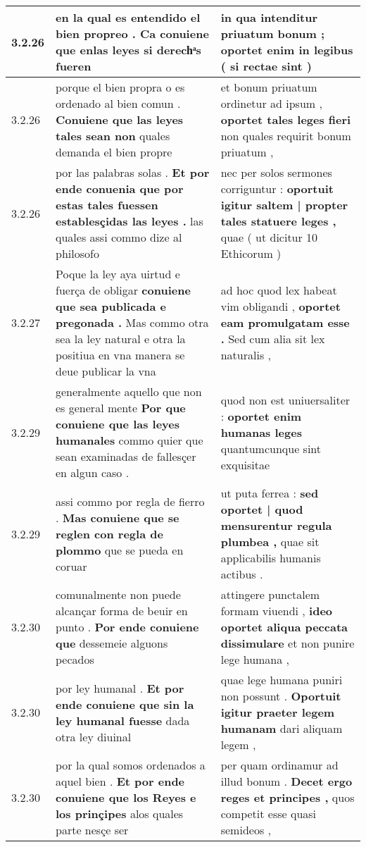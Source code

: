 \begin{tabular}{|p{1cm}|p{6.5cm}|p{6.5cm}|}
3.2.26 & en la qual es entendido el bien propreo . \textbf{ Ca conuiene que enlas leyes } si derechͣs fueren & in qua intenditur priuatum bonum ; \textbf{ oportet enim in legibus } ( si rectae sint ) \\\hline
3.2.26 & porque el bien propra o es ordenado al bien comun . \textbf{ Conuiene que las leyes tales sean non } quales demanda el bien propre & et bonum priuatum ordinetur ad ipsum , \textbf{ oportet tales leges fieri } non quales requirit bonum priuatum , \\\hline
3.2.26 & por las palabras solas . \textbf{ Et por ende conuenia que por estas tales fuessen establesçidas las leyes . } las quales assi commo dize al philosofo & nec per solos sermones corriguntur : \textbf{ oportuit igitur saltem | propter tales statuere leges , } quae ( ut dicitur 10 Ethicorum ) \\\hline
3.2.27 & Poque la ley aya uirtud e fuerça de obligar \textbf{ conuiene que sea publicada e pregonada . } Mas commo otra sea la ley natural e otra la positiua en vna manera se deue publicar la vna & ad hoc quod lex habeat vim obligandi , \textbf{ oportet eam promulgatam esse . } Sed cum alia sit lex naturalis , \\\hline
3.2.29 & generalmente aquello que non es general mente \textbf{ Por que conuiene que las leyes humanales } commo quier que sean examinadas de fallesçer en algun caso . & quod non est uniuersaliter : \textbf{ oportet enim humanas leges } quantumcunque sint exquisitae \\\hline
3.2.29 & assi commo por regla de fierro . \textbf{ Mas conuiene que se reglen con regla de plommo } que se pueda en coruar & ut puta ferrea : \textbf{ sed oportet | quod mensurentur regula plumbea , } quae sit applicabilis humanis actibus . \\\hline
3.2.30 & comunalmente non puede alcançar forma de beuir en punto . \textbf{ Por ende conuiene que } dessemeie alguons pecados & attingere punctalem formam viuendi , \textbf{ ideo oportet aliqua peccata dissimulare } et non punire lege humana , \\\hline
3.2.30 & por ley humanal . \textbf{ Et por ende conuiene que sin la ley humanal fuesse } dada otra ley diuinal & quae lege humana puniri non possunt . \textbf{ Oportuit igitur praeter legem humanam } dari aliquam legem , \\\hline
3.2.30 & por la qual somos ordenados a aquel bien . \textbf{ Et por ende conuiene que los Reyes e los prinçipes } alos quales parte nesçe ser & per quam ordinamur ad illud bonum . \textbf{ Decet ergo reges et principes , } quos competit esse quasi semideos , \\\hline

\end{tabular}
